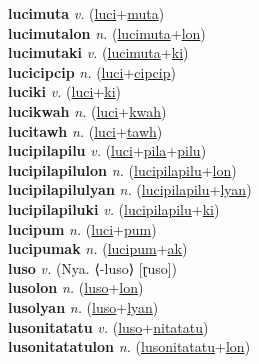 \textbf{lucimuta} \textit{v.} (\hyperref[luci]{luci}+\hyperref[muta]{muta})
 \label{lucimuta} \\
\textbf{lucimutalon} \textit{n.} (\hyperref[lucimuta]{lucimuta}+\hyperref[lon]{lon})
 \label{lucimutalon} \\
\textbf{lucimutaki} \textit{v.} (\hyperref[lucimuta]{lucimuta}+\hyperref[ki]{ki})
 \label{lucimutaki} \\
\textbf{lucicipcip} \textit{n.} (\hyperref[luci]{luci}+\hyperref[cipcip]{cipcip})
 \label{lucicipcip} \\
\textbf{luciki} \textit{v.} (\hyperref[luci]{luci}+\hyperref[ki]{ki})
 \label{luciki} \\
\textbf{lucikwah} \textit{n.} (\hyperref[luci]{luci}+\hyperref[kwah]{kwah})
 \label{lucikwah} \\
\textbf{lucitawh} \textit{n.} (\hyperref[luci]{luci}+\hyperref[tawh]{tawh})
 \label{lucitawh} \\
\textbf{lucipilapilu} \textit{v.} (\hyperref[luci]{luci}+\hyperref[pila]{pila}+\hyperref[pilu]{pilu})
 \label{lucipilapilu} \\
\textbf{lucipilapilulon} \textit{n.} (\hyperref[lucipilapilu]{lucipilapilu}+\hyperref[lon]{lon})
 \label{lucipilapilulon} \\
\textbf{lucipilapilulyan} \textit{n.} (\hyperref[lucipilapilu]{lucipilapilu}+\hyperref[lyan]{lyan})
 \label{lucipilapilulyan} \\
\textbf{lucipilapiluki} \textit{v.} (\hyperref[lucipilapilu]{lucipilapilu}+\hyperref[ki]{ki})
 \label{lucipilapiluki} \\
\textbf{lucipum} \textit{n.} (\hyperref[luci]{luci}+\hyperref[pum]{pum})
 \label{lucipum} \\
\textbf{lucipumak} \textit{n.} (\hyperref[lucipum]{lucipum}+\hyperref[ak]{ak})
 \label{lucipumak} \\
\textbf{luso} \textit{v.} (Nya. ⟨-luso⟩ [ɽuso])
 \label{luso} \\
\textbf{lusolon} \textit{n.} (\hyperref[luso]{luso}+\hyperref[lon]{lon})
 \label{lusolon} \\
\textbf{lusolyan} \textit{n.} (\hyperref[luso]{luso}+\hyperref[lyan]{lyan})
 \label{lusolyan} \\
\textbf{lusonitatatu} \textit{v.} (\hyperref[luso]{luso}+\hyperref[nitatatu]{nitatatu})
 \label{lusonitatatu} \\
\textbf{lusonitatatulon} \textit{n.} (\hyperref[lusonitatatu]{lusonitatatu}+\hyperref[lon]{lon})
 \label{lusonitatatulon} \\
